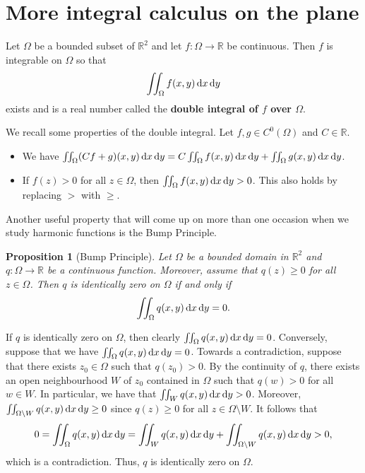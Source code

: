\documentclass[10pt]{article}
\makeatletter
\newcommand{\R}{\mathbb{R}}
\theoremstyle{newstyle}
\newtheorem{prop}[thm]{Proposition}
\newenvironment{pf}[1][\proofname]{\par
  \pushQED{\qed}%
  \normalfont \topsep0\p@\relax
  \trivlist
  \item[\hskip\labelsep\scshape
  #1\@addpunct{.}]\ignorespaces
}{%
  \popQED\endtrivlist\@endpefalse
}
\makeatother
\begin{document}
\newpage 
\section{More integral calculus on the plane}

Let $\Omega$ be a bounded subset of $\R^2$ and let $f : \Omega \to \R$ be continuous. 
Then $f$ is integrable on $\Omega$ so that 
\[ \iint_\Omega f(x, y)\,{\rm d}x\,{\rm d}y \]
exists and is a real number called the {\bf double integral of $f$ over $\Omega$}.

We recall some properties of the double integral. Let $f, g \in C^0(\Omega)$ and 
$C \in \R$. 
\begin{itemize}
    \item We have $\iint_\Omega (Cf+g)(x, y)\,{\rm d}x\,{\rm d}y = C \iint_\Omega f(x, y)\,{\rm d}x
    \,{\rm d}y + \iint_\Omega g(x, y)\,{\rm d}x\,{\rm d}y$. 
    \item If $f(z) > 0$ for all $z \in \Omega$, then $\iint_\Omega f(x, y)\,{\rm d}x\,{\rm d}y > 0$. 
    This also holds by replacing $>$ with $\geq$.
\end{itemize}
Another useful property that will come up on more than one occasion when we study harmonic functions 
is the Bump Principle. 

\begin{prop}[Bump Principle]
Let $\Omega$ be a bounded domain in $\R^2$ and $q : \Omega \to \R$ be a continuous function. Moreover, 
assume that $q(z) \geq 0$ for all $z \in \Omega$. Then $q$ is identically zero on $\Omega$ 
if and only if 
\[ \iint_\Omega q(x, y)\,{\rm d}x\,{\rm d}y = 0. \]
\end{prop}
\begin{pf}
If $q$ is identically zero on $\Omega$, then clearly $\iint_\Omega q(x,y)\,{\rm d}x\,{\rm d}y = 0$. 
Conversely, suppose that we have $\iint_\Omega q(x,y)\,{\rm d}x\,{\rm d}y = 0$. Towards a contradiction, 
suppose that there exists $z_0 \in \Omega$ such that $q(z_0) > 0$. By the continuity of $q$, 
there exists an open neighbourhood $W$ of $z_0$ contained in $\Omega$ such that 
$q(w) > 0$ for all $w \in W$. In particular, we have that $\iint_W q(x,y)\,{\rm d}x\,{\rm d}y > 0$.
Moreover, $\iint_{\Omega\setminus W} q(x,y)\,{\rm d}x\,{\rm d}y \geq 0$ since 
$q(z) \geq 0$ for all $z \in \Omega \setminus W$. It follows that 
\[ 0 = \iint_\Omega q(x,y)\,{\rm d}x\,{\rm d}y = \iint_W q(x,y)\,{\rm d}x\,{\rm d}y 
+ \iint_{\Omega\setminus W} q(x,y)\,{\rm d}x\,{\rm d}y > 0, \]
which is a contradiction. Thus, $q$ is identically zero on $\Omega$.
\end{pf}
\end{document}

